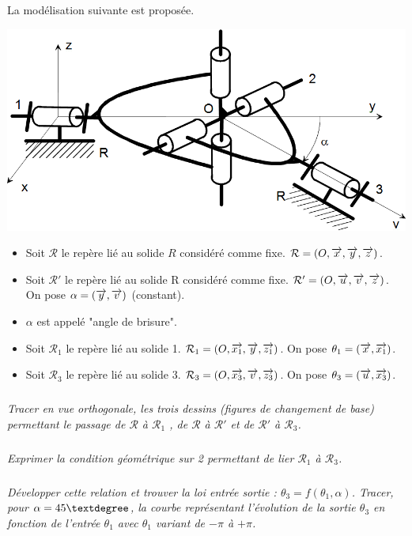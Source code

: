 \documentclass[11pt,oneside]{article}
\begin{document}
La modélisation suivante est proposée.
\begin{center}
\includegraphics[width=.7\textwidth]{png/fig3_4} 
\end{center}

\begin{itemize}
\item Soit $\mathcal{R}$ le repère lié au solide $R$ considéré comme fixe. $\mathcal{R}=\left(O,\overrightarrow{x},\overrightarrow{y},\overrightarrow{z} \right)$.
\item Soit $\mathcal{R}'$ le repère lié au solide R considéré comme fixe. $\mathcal{R}'=\left(O,\overrightarrow{u},\overrightarrow{v},\overrightarrow{z} \right)$. On pose $\alpha = \left(\overrightarrow{y},\overrightarrow{v} \right)$ (constant).
\item $\alpha$ est appelé "angle de brisure".
\item Soit $\mathcal{R}_1$ le repère lié au solide 1. $\mathcal{R}_1 = \left(O,\overrightarrow{x_1},\overrightarrow{y},\overrightarrow{z_1} \right)$. On pose  $\theta_1 = \left(\overrightarrow{x},\overrightarrow{x_1} \right)$.
\item Soit $\mathcal{R}_3$ le repère lié au solide 3. $\mathcal{R}_3 = \left(O,\overrightarrow{x_3},\overrightarrow{v},\overrightarrow{z_3} \right)$. On pose $\theta_3 = \left(\overrightarrow{u},\overrightarrow{x_3} \right)$.
\end{itemize}

\subparagraph{}
\textit{Tracer en vue orthogonale, les trois dessins (figures de changement de base) permettant le passage de $\mathcal{R}$ à $\mathcal{R}_1$ , de $\mathcal{R}$ à $\mathcal{R}'$ et de $\mathcal{R}'$ à $\mathcal{R}_3$.}

\subparagraph{}
\textit{Exprimer la condition géométrique sur 2 permettant de lier $\mathcal{R}_1$ à $\mathcal{R}_3$.}

\subparagraph{}
\textit{Développer cette relation et trouver la loi entrée sortie : $\theta_3 = f(\theta_1 , \alpha)$. Tracer, pour $\alpha=45\textdegree$, la courbe représentant l’évolution de la sortie $\theta_3$ en fonction de l’entrée $\theta_1$ avec $\theta_1$ variant de $-\pi$ à $+\pi$.}
\end{document}
